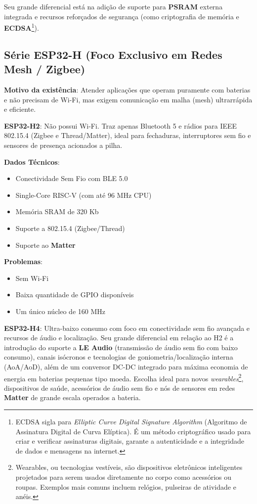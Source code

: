 \documentclass[a4paper,11pt]{article}
\begin{document}
Seu grande diferencial está na adição de suporte para \textbf{PSRAM} externa integrada e recursos reforçados de segurança (como criptografia de memória e \textbf{ECDSA}\footnote{ECDSA sigla para \textit{Elliptic Curve Digital Signature Algorithm} (Algoritmo de Assinatura Digital de Curva Elíptica). É um método criptográfico usado para criar e verificar assinaturas digitais, garante a autenticidade e a integridade de dados e mensagens na internet.}).

\subsection{Série ESP32-H (Foco Exclusivo em Redes Mesh / Zigbee)}
\textbf{Motivo da existência}: Atender aplicações que operam puramente com baterias e não precisam de Wi-Fi, mas exigem comunicação em malha (mesh) ultrarrápida e eficiente.

\textbf{ESP32-H2}: Não possui Wi-Fi. Traz apenas Bluetooth 5 e rádios para IEEE 802.15.4 (Zigbee e Thread/Matter), ideal para fechaduras, interruptores sem fio e sensores de presença acionados a pilha.

\textbf{Dados Técnicos}: \vspace{-1em}
\begin{itemize}[nolistsep]
	\item Conectividade Sem Fio	com BLE 5.0
	\item Single-Core RISC-V (com até 96 MHz CPU)
	\item Memória SRAM de 320 Kb
	\item Suporte a 802.15.4 (Zigbee/Thread)
	\item Suporte ao \textbf{Matter}
\end{itemize}

\textbf{Problemas}: \vspace{-1em}
\begin{itemize}[nolistsep]
	\item Sem Wi-Fi
	\item Baixa quantidade de GPIO disponíveis
	\item Um único núcleo de 160 MHz
\end{itemize}

\textbf{ESP32-H4}: Ultra-baixo consumo com foco em conectividade sem fio avançada e recursos de áudio e localização. Seu grande diferencial em relação ao H2 é a introdução do suporte a \textbf{LE Audio} (transmissão de áudio sem fio com baixo consumo), canais isócronos e tecnologias de goniometria/localização interna (AoA/AoD), além de um conversor DC-DC integrado para máxima economia de energia em baterias pequenas tipo moeda. Escolha ideal para novos \textit{wearables}\footnote{Wearables, ou tecnologias vestíveis, são dispositivos eletrônicos inteligentes projetados para serem usados diretamente no corpo como acessórios ou roupas. Exemplos mais comuns incluem relógios, pulseiras de atividade e anéis.}, dispositivos de saúde, acessórios de áudio sem fio e nós de sensores em redes \textbf{Matter} de grande escala operados a bateria.
\end{document}
